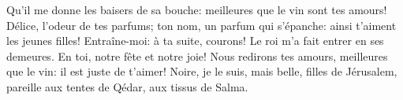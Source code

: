 Qu’il me donne les baisers de sa bouche:
	meilleures que le vin sont tes amours!
Délice, l’odeur de tes parfums; ton nom, un parfum qui s’épanche:
	ainsi t’aiment les jeunes filles!
Entraîne-moi: à ta suite, courons!
	Le roi m’a fait entrer en ses demeures.
En toi, notre fête et notre joie!
	Nous redirons tes amours, meilleures que le vin:
	il est juste de t’aimer!
Noire, je le suis, mais belle, filles de Jérusalem,
	pareille aux tentes de Qédar, aux tissus de Salma.
